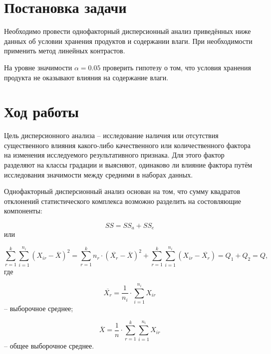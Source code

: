 \section{Постановка задачи}

Необходимо провести однофакторный дисперсионный анализ приведённых ниже данных об условии хранения продуктов и содержании влаги. При необходимости применить метод линейных контрастов.


На уровне значимости $\alpha = 0.05$ проверить гипотезу о том, что условия хранения продукта не оказывают влияния на содержание влаги.

\section{Ход работы}

Цель дисперсионного анализа -- исследование наличия или отсутствия существенного влияния какого-либо качественного или количественного фактора на изменения исследуемого результативного признака. Для этого фактор разделяют на классы градации и выясняют, одинаково ли влияние фактора путём исследования значимости между средними в наборах данных.

Однофакторный дисперсионный анализ основан на том, что сумму квадратов отклонений статистического комплекса возможно разделить на состовляющие компоненты:

\begin{equation}
	SS = SS_a + SS_e
\end{equation}
или

\begin{equation}\label{disps}
	\sum\limits_{r=1}^k \sum\limits_{i=1}^{n_i} \left(X_{ir} - \overline{X} \right)^2 = \sum\limits_{r=1}^k n_r \cdot (\overline{X_r} - \overline{X})^2 + \sum\limits_{r=1}^k \sum\limits_{i=1}^{n_i} \left(X_{ir} - \overline{X_r}\right) = Q_1 + Q_2 = Q,
\end{equation}
где 

\begin{equation}
	\overline{X_r} = \frac{1}{n_i} \cdot \sum\limits_{i=1}^{n_i} X_{ir}
\end{equation}
-- выборочное среднее;

\begin{equation}
	\overline{X} = \frac{1}{n} \cdot \sum\limits_{r=1}^k \sum\limits_{i=1}^{n_i} X_{ir}
\end{equation}
-- общее выборочное среднее.


